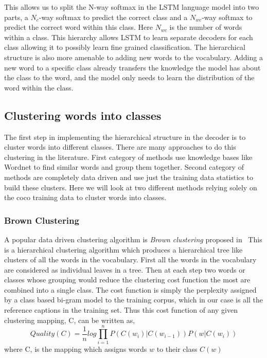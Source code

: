 This allows us to split the N-way softmax in the LSTM language model into two
parts, a $N_c$-way softmax to predict the correct class and a $N_{wc}$-way
softmax to predict the correct word within this class.
Here $N_{wc}$ is the number of words within a class.
This hierarchy allows LSTM to learn separate decoders for each class allowing it to
possibly learn fine grained classification.
The hierarchical structure is also more amenable to adding new words to the vocabulary.
Adding a new word to a specific class already transfers the knowledge the model
has about the class to the word, and the model only needs to learn the
distribution of the word within the class.

\subsection{Clustering words into classes}
The first step in implementing the hierarchical structure in the decoder is to
cluster words into different classes.
There are many approaches to do this clustering in the literature.
First category of methods use knowledge bases like Wordnet to find similar words
and group them together.
Second category of methods are completely data driven and use just the training
data statistics to build these clusters.
Here we will look at two different methods relying solely on the coco training
data to cluster words into classes.

\subsubsection{Brown Clustering}
A popular data driven clustering algorithm is \emph{Brown clustering} proposed
in~\cite{BrownClust}
This is a hierarchical clustering algorithm which produces a hierarchical tree
like clusters of all the words in the vocabulary.
First all the words in the vocabulary are considered as individual leaves in a
tree. 
Then at each step two words or classes whose grouping would reduce the clustering
cost function the most are combined into a single class.
The cost function is simply the perplexity assigned by a class based bi-gram
model to the training corpus, which in our case is all the reference captions in
the training set.
Thus this cost function of any given clustering mapping, C, can be written as,
\begin{equation}
  \label{eq:brown} 
        Quality(C) = \frac{1}{n} log \prod_{i=1}^{n} P(C(w_i)|C(w_{i-1})) P(w|C(w_i))
\end{equation}
\noindent where C, is the mapping which assigns words $w$ to their class $C(w)$

